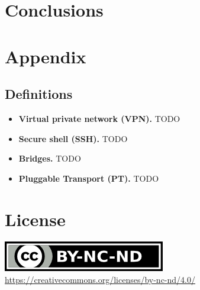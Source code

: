 \documentclass[sigconf, screen]{acmart}
\begin{document}
\section{Conclusions}
\label{s:conclusions}
\appendix
\section{Appendix}
\label{s:appendix}

\subsection{Definitions}
\label{ss:definitions}
\begin{itemize}
	\item \textbf{Virtual private network (VPN).} TODO		%
	\item \textbf{Secure shell (SSH).} TODO 				%
	\item \textbf{Bridges.}	TODO 							%
	\item \textbf{Pluggable Transport (PT).} TODO 			%
\end{itemize}


\section*{License}
\label{s:license}
\begin{center}
	\includegraphics{by-nc-nd.png} \\
	\url{https://creativecommons.org/licenses/by-nc-nd/4.0/}
\end{center}
\end{document}
